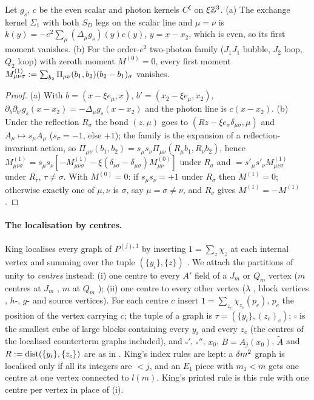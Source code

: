 \begin{lemma}[reflection]\label{lem:a02:REF}
Let $g_s$, $c$ be the even scalar and photon kernels $C^\xi$ on $\xi\mathbb Z^3$. \textup{(a)} The exchange kernel $\Sigma_1$ with both $S_D$ legs on the scalar line and $\mu=\nu$ is $k(y)=-e^2\sum_\mu(\Delta_\mu g_s)(y)c(y)$, $y=x-x_2$, which is even, so its first moment vanishes. \textup{(b)} For the order-$e^2$ two-photon family ($J_1J_1$ bubble, $J_2$ loop, $Q_2$ loop) with zeroth moment $M^{(0)}=0$, every first moment $M^{(1)}_{\mu\nu\sigma}:=\sum_{b_2}\Pi_{\mu\nu}(b_1,b_2)(b_2-b_1)_\sigma$ vanishes.
\end{lemma}
\begin{proof}
(a) With $b=(x-\xi e_\mu,x)$, $b'=(x_2-\xi e_\mu,x_2)$, $\partial_b\partial_{b'}g_s(x-x_2)=-\Delta_\mu g_s(x-x_2)$ and the photon line is $c(x-x_2)$. (b) Under the reflection $R_\sigma$ the bond $(z,\mu)$ goes to $(Rz-\xi e_\sigma\delta_{\mu\sigma},\mu)$ and $A_\mu\mapsto s_\mu A_\mu$ ($s_\sigma=-1$, else $+1$); the family is the expansion of a reflection-invariant action, so $\Pi_{\mu\nu}(b_1,b_2)=s_\mu s_\nu\Pi_{\mu\nu}(R_\mu b_1,R_\nu b_2)$, hence $M^{(1)}_{\mu\nu\sigma}=s_\mu s_\nu[-M^{(1)}_{\mu\nu\sigma}-\xi(\delta_{\nu\sigma}-\delta_{\mu\sigma})M^{(0)}_{\mu\nu}]$ under $R_\sigma$ and $=s'_\mu s'_\nu M^{(1)}_{\mu\nu\sigma}$ under $R_\tau$, $\tau\ne\sigma$. With $M^{(0)}=0$: if $s_\mu s_\nu=+1$ under $R_\sigma$ then $M^{(1)}=0$; otherwise exactly one of $\mu,\nu$ is $\sigma$, say $\mu=\sigma\ne\nu$, and $R_\nu$ gives $M^{(1)}=-M^{(1)}$.
\end{proof}

\paragraph{The localisation by centres.} King localises every graph of $P^{(j),1}$ by inserting $1=\sum_z\chi_z$ at each internal vertex \cite[(3.36)]{K1} and summing over the tuple $(\{y_i\},\{z\})$ \cite[(3.37)]{K1}. We attach the partitions of unity to \emph{centres} instead: \textup{(i)} one centre to every $A'$ field of a $J_m$ or $Q_m$ vertex ($m$ centres at $J_m$ \cite[(3.22)]{K1}, $m$ at $Q_m$ \cite[(3.23)]{K1}); \textup{(ii)} one centre to every other vertex ($\lambda$ \cite[(3.18)]{K1}, block vertices \cite[(3.24)--(3.26)]{K1}, $h$-, $g$- and source vertices). For each centre $c$ insert $1=\sum_{z_c}\chi_{z_c}(p_c)$, $p_c$ the position of the vertex carrying $c$; the tuple of a graph is $\tau=(\{y_i\},(z_c)_c)$; $\square$ is the smallest cube of large blocks containing every $y_i$ and every $z_c$ (the centres of the localised counterterm graphs included), and $\square'$, $\square''$, $x_0$, $B=A_j(x_0)$, $\tilde A$ and $R:=\operatorname{dist}(\{y_i\},\{z_c\})$ are as in \cite[pp.~660--662]{K1}. King's index rules \cite[p.~667]{K1} are kept: a $\delta m^2$ graph is localised only if all its integers are $<j$, and an $E_1$ piece with $m_1<m$ gets one centre at one vertex connected to $l(m)$. King's printed rule is this rule with one centre per vertex in place of (i).

